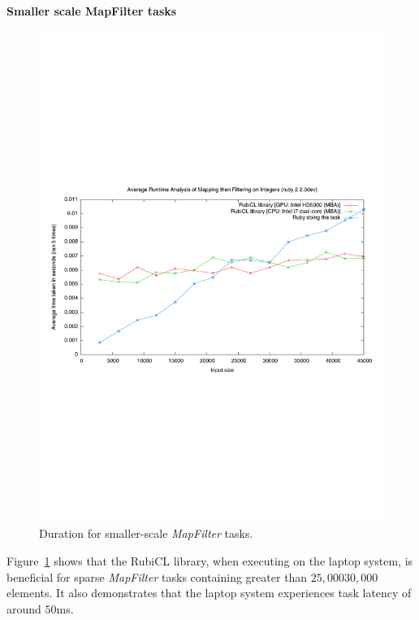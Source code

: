 \paragraph*{Smaller scale MapFilter tasks}
\begin{figure}[H]
  \includegraphics[trim=0cm 8cm 0cm 8cm, clip=true, width=\textwidth]{./graphing/smallmapfilter.pdf}
  \caption{Duration for smaller-scale \emph{MapFilter} tasks.}
  \label{fig:mapfil_tasksmallrun}
\end{figure}
Figure~\ref{fig:mapfil_tasksmallrun} shows that the RubiCL library, when executing on the laptop system, is beneficial for sparse \emph{MapFilter} tasks containing greater than $25,000$\textendash$30,000$ elements. It also demonstrates that the laptop system experiences task latency of around $50$ms.

